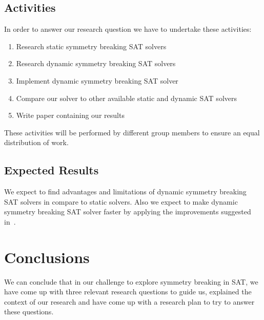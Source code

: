 		\subsection{Activities}
			In order to answer our research question we have to undertake these activities:
	
			\begin{enumerate}
				\item Research static symmetry breaking SAT solvers
				\item Research dynamic symmetry breaking SAT solvers
				\item Implement dynamic symmetry breaking SAT solver
				\item Compare our solver to other available static and dynamic SAT solvers
				\item Write paper containing our results
			\end{enumerate}

			These activities will be performed by different group members to ensure an equal distribution of work.

		\subsection{Expected Results}
			We expect to find advantages and limitations of dynamic symmetry breaking SAT solvers in compare to static solvers.
			Also we expect to make dynamic symmetry breaking SAT solver faster by applying the improvements suggested in~\cite{devriendt2012symmetry}.

	\section{Conclusions}
	We can conclude that in our challenge to explore symmetry breaking in SAT, we have come up with three relevant research questions to guide us, explained the context of our research and have come up with a research plan to try to answer these questions.

	
	


